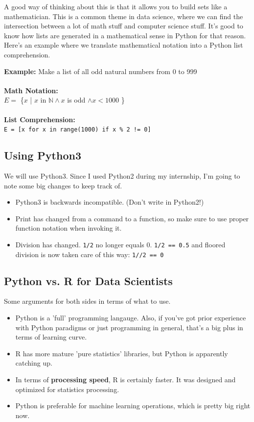 \documentclass[english, 10pt]{article}
\begin{document}
A good way of thinking about this is that it allows you to build sets like a mathematician. This is a common theme in data science, where we can find the intersection between a lot of math stuff and computer science stuff. It's good to know how lists are generated in a mathematical sense in Python for that reason. Here's an example where we translate mathematical notation into a Python list comprehension.\\

\begin{myproof}
\textbf{Example:} Make a list of all odd natural numbers from 0 to 999\\\\
\textbf{Math Notation:}\\ $E =$ \{$x$ | $x$ in $\mathbb{N} \land x$ is odd $\land x<1000$ \}\\\\
\textbf{List Comprehension:}\\
\texttt{E = [x for x in range(1000) if x \% 2 != 0]}
\end{myproof}

\subsection{Using Python3}

We will use Python3. Since I used Python2 during my internship, I'm going to note some big changes to keep track of.\\

\begin{itemize}
	\item Python3 is backwards incompatible. (Don't write in Python2!)
	\item Print has changed from a command to a function, so make sure to use proper function notation when invoking it.
	\item Division has changed. \texttt{1/2} no longer equals 0. \texttt{1/2 == 0.5} and floored division is now taken care of this way: \texttt{1//2 == 0}
\end{itemize}

\subsection{Python vs. R for Data Scientists}

Some arguments for both sides in terms of what to use.

\begin{itemize}
	\item Python is a 'full' programming langauge. Also, if you've got prior experience with Python paradigms or just programming in general, that's a big plus in terms of learning curve.
	\item R has more mature 'pure statistics' libraries, but Python is apparently catching up.
	\item In terms of \textbf{processing speed}, R is certainly faster. It was designed and optimized for statistics processing.
	\item Python is preferable for machine learning operations, which is pretty big right now.
\end{itemize}
\end{document}

